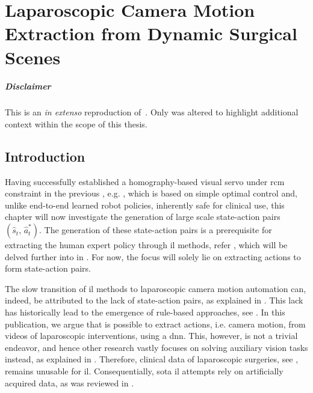 \graphicspath{{chapter_3}}
\chapter[Laparoscopic Camera Motion Extraction]{Laparoscopic Camera Motion Extraction from Dynamic Surgical Scenes}
\label{chap:camera_motion_extraction}
\minitoc

\paragraph{Disclaimer} This  is an \textit{in extenso} reproduction of~\cite{huber2022deep}. Only  was altered to highlight additional context within the scope of this thesis.

\newpage

\section{Introduction}
\label{c3:sec:introduction}
Having successfully established a homography-based visual servo under \gls{rcm} constraint in the previous , e.g. , which is based on simple optimal control and, unlike end-to-end learned robot policies, inherently safe for clinical use, this chapter will now investigate the generation of large scale state-action pairs $(\hat{s}_t,\,\hat{a}^*_t)$. The generation of these state-action pairs is a prerequisite for extracting the human expert policy through \gls{il} methods, refer , which will be delved further into in . For now, the focus will solely lie on extracting actions to form state-action pairs.

The slow transition of \gls{il} methods to laparoscopic camera motion automation can, indeed, be attributed to the lack of state-action pairs, as explained in . This lack has historically lead to the emergence of rule-based approaches, see . In this publication, we argue that is possible to extract actions, i.e. camera motion, from videos of laparoscopic interventions, using a \gls{dnn}. This, however, is not a trivial endeavor, and hence other research vastly focuses on solving auxiliary vision tasks instead, as explained in . Therefore, clinical data of laparoscopic surgeries, see , remains unusable for \gls{il}. Consequentially, \gls{sota} \gls{il} attempts rely on artificially acquired data, as was reviewed in .

